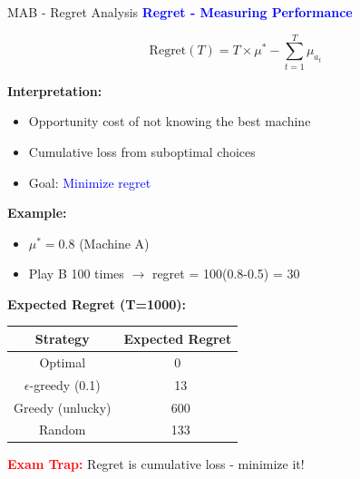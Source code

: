 \documentclass[8pt]{beamer}
\begin{document}
	\begin{frame}{MAB - Regret Analysis}
		\fontsize{6.5}{7.5}\selectfont
		\textcolor{blue}{\textbf{Regret - Measuring Performance}}
		
		\[
		\text{Regret}(T) = T \times \mu^* - \sum_{t=1}^T \mu_{a_t}
		\]
		
		\textbf{Interpretation:}
		\begin{itemize}
			\item Opportunity cost of not knowing the best machine
			\item Cumulative loss from suboptimal choices
			\item Goal: \textcolor{blue}{Minimize regret}
		\end{itemize}
		
		\textbf{Example:}
		\begin{itemize}
			\item $\mu^* = 0.8$ (Machine A)
			\item Play B 100 times $\rightarrow$ regret = 100(0.8-0.5) = 30
		\end{itemize}
		
		\textbf{Expected Regret (T=1000):}
		\begin{tabular}{|c|c|}
			\hline
			Strategy & Expected Regret \\
			\hline
			Optimal & 0 \\
			\hline
			$\epsilon$-greedy (0.1) & ~13 \\
			\hline
			Greedy (unlucky) & ~600 \\
			\hline
			Random & ~133 \\
			\hline
		\end{tabular}
		
		\textcolor{red}{\textbf{Exam Trap:}} Regret is cumulative loss - minimize it!
	\end{frame}
	
\end{document}
